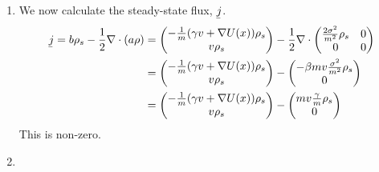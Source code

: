 \documentclass[12pt]{article}
\theoremstyle{plain}
\theoremstyle{definition}
\theoremstyle{remark}
\begin{document}
\begin{enumerate}
\begin{enumerate}
      \item %
        We now calculate the steady-state flux, $\underaccent{\bar}{j}$.
        \begin{align*}
          \underaccent{\bar}{j}
          =
          b\rho_s - \frac{1}{2}\nabla \cdot(a\rho)
          &=
          \begin{pmatrix}
            -\frac{1}{m} (\gamma v + \nabla U(x)) \rho_s\\
            v\rho_s
          \end{pmatrix}
          - \frac{1}{2}
          \nabla \cdot
          \begin{pmatrix}
            \frac{2\sigma^2}{m^2}\rho_s & 0 \\
            0 & 0
          \end{pmatrix}\\
          &=
          \begin{pmatrix}
            -\frac{1}{m} (\gamma v + \nabla U(x)) \rho_s\\
            v\rho_s
          \end{pmatrix}
          -
          \begin{pmatrix}
            -\beta mv \frac{\sigma^2}{m^2}\rho_s \\
            0
          \end{pmatrix}\\
          &=
          \begin{pmatrix}
            -\frac{1}{m} (\gamma v + \nabla U(x)) \rho_s\\
            v\rho_s
          \end{pmatrix}
          -
          \begin{pmatrix}
            mv \frac{\gamma}{m}\rho_s \\
            0
          \end{pmatrix}
        \end{align*}
        This is non-zero.

      \item %



\end{enumerate}
\end{enumerate}
\end{document}
